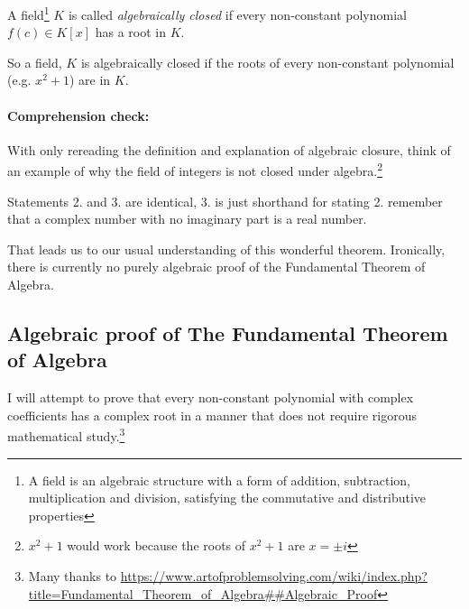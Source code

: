 \documentclass[12pt]{article}
\begin{document}
A field\footnote{A field is an algebraic structure with a form of addition, subtraction, multiplication and division, satisfying the commutative and distributive properties} $K$ is called \emph{algebraically closed} if every non-constant polynomial $f(c) \in K[x]$ has a root in $K$.

So a field, $K$ is algebraically closed if the roots of every non-constant polynomial (e.g. $x^2+1$) are in $K$.

\paragraph*{Comprehension check:} With only rereading the definition and explanation of algebraic closure, think of an example of why the field of integers is not closed under algebra.\footnote{$x^2+1$ would work because the roots of $x^2+1$ are $x=\pm i$}

Statements 2. and 3. are identical, 3. is just shorthand for stating 2. remember that a complex number with no imaginary part is a real number.

That leads us to our usual understanding of this wonderful theorem.  Ironically, there is currently no purely algebraic proof of the Fundamental Theorem of Algebra.  

\subsection*{Algebraic proof of The Fundamental Theorem of Algebra}
I will attempt to prove that every non-constant polynomial with complex coefficients has a complex root in a manner that does not require rigorous mathematical study.\footnote{Many thanks to \url{https://www.artofproblemsolving.com/wiki/index.php?title=Fundamental_Theorem_of_Algebra##Algebraic_Proof}}\\

%
\end{document}
